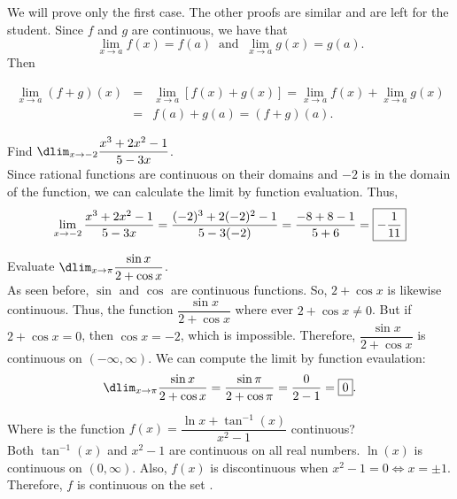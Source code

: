 \documentclass{book}
\begin{document}
\begin{pf}
We will prove only the first case. The other proofs are similar and are left for the student. Since $f$ and $g$ are continuous, we have that \[\lim_{x\to a} f(x) = f(a) \;\;\mbox{and}\;\;  \lim_{x\to a} g(x) = g(a).\]
Then \vspace{-25pt}

\begin{eqnarray*}
\lim_{x\to a} (f+g)(x) &=& \lim_{x\to a} [f(x) + g(x)] = \lim_{x\to a} f(x) + \lim_{x\to a} g(x) \\
&=& f(a) + g(a)  = (f+g)(a). 
\end{eqnarray*}
\end{pf}\vs

\begin{Exam} Find $\dlim_{x\to -2} \dfrac{x^3+2x^2-1}{5-3x}$.\\

Since rational functions are continuous on their domains and $-2$ is in the domain of the function, we can calculate the limit by function evaluation.
Thus, \[\lim_{x\to -2} \dfrac{x^3+2x^2-1}{5-3x} =\dfrac{(-2)^3+2(-2)^2-1}{5-3(-2)} = \dfrac{-8+8-1}{5+6} = \fbox{$-\dfrac{1}{11}$}\]
\end{Exam}\vs

\begin{Exam} Evaluate $\dlim_{x\to \pi} \dfrac{\sin x}{2+\cos x}$.\\

As seen before, $\sin$ and $\cos$ are continuous functions. So, $2+\cos x$ is likewise continuous. Thus, the function $\dfrac{\sin x}{2+\cos x}$ where ever $2+\cos x\neq 0$. But if $2+\cos x = 0$, then $\cos x = -2$, which is impossible. Therefore, $ \dfrac{\sin x}{2+\cos x}$ is continuous on $(-\infty, \infty)$. We can compute the limit by function evaulation:
\[\dlim_{x\to \pi} \dfrac{\sin x}{2+\cos x} = \dfrac{\sin \pi}{2+\cos \pi} = \dfrac{0}{2-1} = \fbox{$0$}. \]
\end{Exam}\vs

\begin{Exam} Where is the function $f(x) = \dfrac{\ln x+\tan^{-1}(x)}{x^2-1}$ continuous?\\

Both $\tan^{-1}(x)$ and $x^2-1$ are continuous on all real numbers. $\ln(x)$ is continuous on $(0,\infty)$. Also, $f(x)$ is discontinuous when $x^2-1 = 0 \Leftrightarrow x = \pm 1$. Therefore, $f$ is continuous on the set . 
\end{Exam}\vs
\end{document}
